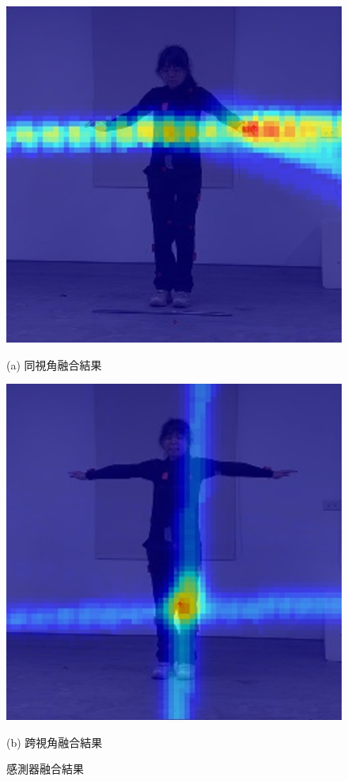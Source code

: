 \begin{figure}[!ht]
   \centering
   \begin{minipage}{.5\textwidth}
      \centering
      \includegraphics[width=.95\linewidth]{figure/ch3_fig_same_view.png}
      \caption*{(a) 同視角融合結果}
   \end{minipage}%
   \vspace{5mm}%
   \begin{minipage}{.5\textwidth}
      \centering
      \includegraphics[width=.95\linewidth]{figure/ch3_fig_cross_view.png}
      \caption*{(b) 跨視角融合結果}
   \end{minipage}
   \captionsetup{justification=centering}
   \caption[感測器融合結果]{感測器融合結果}
   \label{ch3_fig_fusion_result}
\end{figure}

